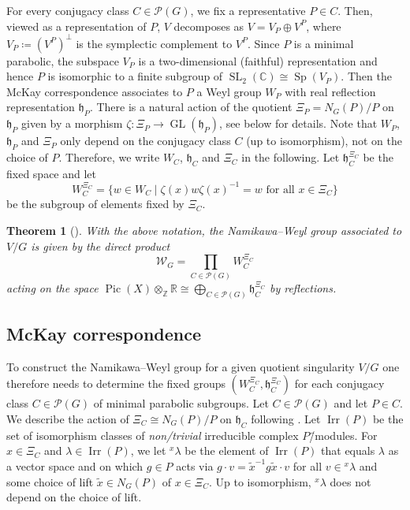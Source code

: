 \documentclass[10pt,a4paper]{amsart}
\newtheorem{theorem}{Theorem}[section]
\DeclareMathOperator{\GL}{GL}
\DeclareMathOperator{\Irr}{Irr}
\DeclareMathOperator{\Pic}{Pic}
\DeclareMathOperator{\SL}{SL}
\DeclareMathOperator{\Sp}{Sp}
\newcommand{\CC}{\mathbb C}
\newcommand{\RR}{\mathbb R}
\newcommand{\ZZ}{\mathbb Z}
\begin{document}
For every conjugacy class \(C\in\mathcal P(G)\), we fix a representative \(P\in C\). 
Then, viewed as a representation of \(P\), \(V\) decomposes as $V = V_P \oplus V^P$, where $V_P \coloneqq (V^P)^{\perp}$ is the symplectic complement to $V^P$. Since $P$ is a minimal parabolic, the subspace $V_P$ is a two-dimensional (faithful) representation and hence \(P\) is isomorphic to a finite subgroup of \(\SL_2(\CC) \cong \Sp(V_P)\).
Then the McKay correspondence \cite{McK80,GV83} associates to \(P\) a Weyl group \(W_P\) with real reflection representation \(\mathfrak h_P\).
There is a natural action of the quotient \(\Xi_P = N_G(P) / P\) on \(\mathfrak h_P\) given by a morphism \(\zeta: \Xi_P \to \GL(\mathfrak h_P)\), see below for details.
Note that \(W_P\), \(\mathfrak h_P\) and \(\Xi_P\) only depend on the conjugacy class \(C\) (up to isomorphism), not on the choice of \(P\). Therefore, we write \(W_C\), \(\mathfrak h_C\) and \(\Xi_C\) in the following.
Let \(\mathfrak h_C^{\Xi_C}\) be the fixed space and let \[W_C^{\Xi_C} = \{w \in W_C \mid \zeta(x) w \zeta(x)^{-1} = w\text{ for all }x\in \Xi_C\}\] be the subgroup of elements fixed by $\Xi_C$.

\begin{theorem}[{\cite[Thm.~1.3]{Bel16}}]
  \label{thm:directproduct}
  With the above notation, the Namikawa--Weyl group associated to \(V/G\) is given by the direct product \[\mathcal W_G = \prod_{C\in\mathcal P(G)} W_C^{\Xi_C}\] acting on the space \(\Pic(X)\otimes_\ZZ\RR \cong \bigoplus_{C\in\mathcal P(G)} \mathfrak h_C^{\Xi_C}\) by reflections.
\end{theorem}

\subsection{McKay correspondence}
To construct the Namikawa--Weyl group for a given quotient singularity \(V/G\) one therefore needs to determine the fixed groups \((W_C^{\Xi_C}, \mathfrak h_C^{\Xi_C})\) for each conjugacy class \(C\in \mathcal P(G)\) of minimal parabolic subgroups.
Let \(C\in \mathcal P(G)\) and let \(P\in C\).
We describe the action of \(\Xi_C \cong N_G(P)/P\) on \(\mathfrak h_C\) following \cite[Sect.~2.1]{Bel16}.
Let \(\Irr(P)\) be the set of isomorphism classes of \emph{non\-/trivial} irreducible complex \(P\)\=/modules.
For \(x\in \Xi_C\) and \(\lambda\in \Irr(P)\), we let \({}^x\lambda\) be the element of \(\Irr(P)\) that equals \(\lambda\) as a vector space and on which \(g\in P\) acts via \(g\cdot v = \tilde{x}^{-1} g \tilde{x} \cdot v\) for all \(v\in {}^x\lambda\) and some choice of lift $\tilde{x} \in N_G(P)$ of $x \in \Xi_C$. Up to isomorphism, ${}^x \lambda$ does not depend on the choice of lift. 
\end{document}
